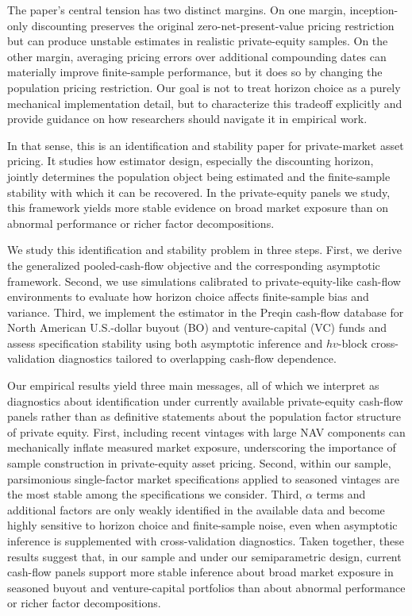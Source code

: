 The paper's central tension has two distinct margins. 
On one margin, inception-only discounting preserves the original zero-net-present-value pricing restriction but can produce unstable estimates in realistic private-equity samples. 
On the other margin, averaging pricing errors over additional compounding dates can materially improve finite-sample performance, but it does so by changing the population pricing restriction. 
Our goal is not to treat horizon choice as a purely mechanical implementation detail, but to characterize this tradeoff explicitly and provide guidance on how researchers should navigate it in empirical work.

In that sense, this is an identification and stability paper for private-market asset pricing. 
It studies how estimator design, especially the discounting horizon, jointly determines the population object being estimated and the finite-sample stability with which it can be recovered. 
In the private-equity panels we study, this framework yields more stable evidence on broad market exposure than on abnormal performance or richer factor decompositions.

We study this identification and stability problem in three steps. 
First, we derive the generalized pooled-cash-flow objective and the corresponding asymptotic framework. 
Second, we use simulations calibrated to private-equity-like cash-flow environments to evaluate how horizon choice affects finite-sample bias and variance. 
Third, we implement the estimator in the Preqin cash-flow database for North American U.S.-dollar buyout (BO) and venture-capital (VC) funds and assess specification stability using both asymptotic inference and $hv$-block cross-validation diagnostics \citep{R00} tailored to overlapping cash-flow dependence.

Our empirical results yield three main messages, all of which we interpret as diagnostics about identification under currently available private-equity cash-flow panels rather than as definitive statements about the population factor structure of private equity. 
First, including recent vintages with large NAV components can mechanically inflate measured market exposure, underscoring the importance of sample construction in private-equity asset pricing. 
Second, within our sample, parsimonious single-factor market specifications applied to seasoned vintages are the most stable among the specifications we consider. 
Third, $\alpha$ terms and additional factors are only weakly identified in the available data and become highly sensitive to horizon choice and finite-sample noise, even when asymptotic inference is supplemented with cross-validation diagnostics. 
Taken together, these results suggest that, in our sample and under our semiparametric design, current cash-flow panels support more stable inference about broad market exposure in seasoned buyout and venture-capital portfolios than about abnormal performance or richer factor decompositions.

